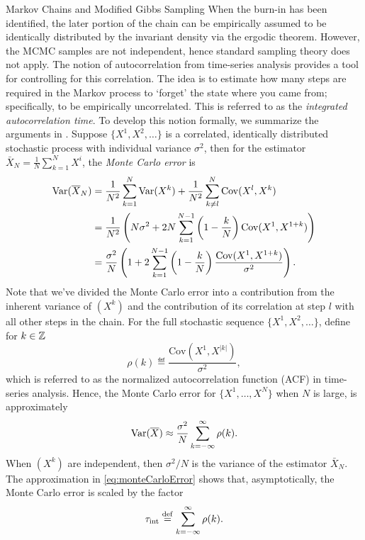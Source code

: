 \begin{chapter}{Markov Chains and Modified Gibbs Sampling}
When the burn-in has been identified, the later portion of the chain can be empirically assumed to be identically distributed by the invariant density via the ergodic theorem. 
However, the MCMC samples are not independent, hence standard sampling theory does not apply.
The notion of autocorrelation from time-series analysis provides a tool for controlling for this correlation.
The idea is to estimate how many steps are required in the Markov process to `forget' the state where you came from; specifically, to be empirically uncorrelated.
This is referred to as the \emph{integrated autocorrelation time}.
To develop this notion formally, we summarize the arguments in \citep{sokal1997monte}. 
Suppose $\{X^1,X^2,\dots\}$ is a correlated, identically distributed stochastic process with individual variance $\sigma^2$, then for the estimator $\bar X_N=\frac1N\sum_{k=1}^NX^i$, the {\em Monte Carlo error} is  
\begin{align}
{\rm Var}(\bar X_N)
  &=\frac{1}{N^2}\sum_{k=1}^N{\rm Var}(X^k)+\frac{1}{N^2}\sum_{k\neq l}^N {\rm Cov}(X^l,X^k)\nonumber\\
  &=\frac{1}{N^2}\left(N\sigma^2+2N\sum_{k=1}^{N-1}\left(1-\frac{k}{N}\right){\rm Cov}(X^1,X^{1+k})\right)\nonumber\\
  &=\frac{\sigma^2}{N}\left(1+2\sum_{k=1}^{N-1}\left(1-\frac{k}{N}\right)\frac{{\rm Cov}(X^1,X^{1+k})}{\sigma^2}\right).
\end{align}
Note that we've divided the Monte Carlo error into a contribution from the inherent variance of $(X^k)$ and the contribution of its correlation at step $l$ with all other steps in the chain.
For the full stochastic sequence $\{X^1,X^2,\dots\}$, define for $k \in \Z$
\begin{equation}
  \rho(k) \eqdef \frac{\mathrm{Cov}(X^1, X^{|k|})}{\sigma^2},
\end{equation}
which is referred to as the normalized autocorrelation function (ACF) in time-series analysis.
Hence, the Monte Carlo error for $\{X^1,\dots,X^N\}$ when $N$ is large, is approximately 
\begin{equation} \label{eq:monteCarloError}
{\rm Var}(\bar X) \approx \frac{\sigma^2}{N}\sum_{k=-\infty}^\infty \rho(k).
\end{equation}
When $(X^k)$ are independent, then $\sigma^2/N$ is the variance of the estimator $\bar X_N$.
The approximation in \eqref{eq:monteCarloError} shows that, asymptotically, the Monte Carlo error is scaled by the factor
\begin{equation}
  \tau_{\rm int}\eqdef \sum_{k=-\infty}^\infty \rho(k).

\end{equation}
\end{chapter}
